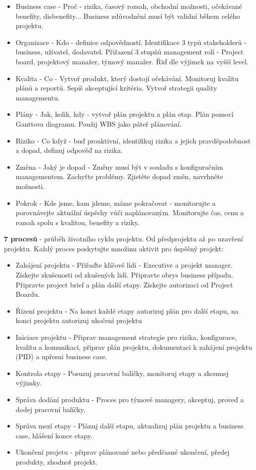\documentclass[11pt,a4paper]{article}
\begin{document}
        \begin{itemize}
            \item Business case - Proč - rizika, časový rozsah, obchodní možnosti, očekávané benefity, disbenefity... Business zdůvodnění musí být validní během celého projektu.
            \item Organizace - Kdo - definice odpovědností. Identifikace 3 typů stakeholderů - business, uživatel, dodavatel. Přiřazení 3 stupňů management rolí - Project board, projektový manažer, týmový manažer. Řiď dle výjimek na vyšší level.
            \item Kvalita - Co - Vytvoř produkt, který dostojí očekávání. Monitoruj kvalitu plánů a reportů. Sepiš akceptující kritéria. Vytvoř strategii quality managementu.
            \item Plány - Jak, kolik, kdy - vytvoř plán projektu a plán etap. Plán pomocí Ganttova diagramu. Použij WBS jako páteř plánování.
            \item Riziko - Co když - buď proaktivní, identifikuj rizika a jejich pravděpodobnost a dopad, definuj odpověď na rizika.
            \item Změna - Jaký je dopad - Změny musí být v souladu s konfiguračním managementem. Zachyťte problémy. Zjistěte dopad změn, navrhněte možnosti.
            \item Pokrok - Kde jsme, kam jdeme, máme pokračovat - monitorujte a porovnávejte aktuální úspěchy vůči naplánovaným. Monitorujte čas, cenu a rozsah spolu s kvalitou, benefity a riziky.
        \end{itemize}
        \textbf{7 procesů} - průběh životního cyklu projektu. Od předprojektu až po uzavření projektu. Každý proces poskytujte množinu aktivit pro úspěšný projekt:
        \begin{itemize}
            \item Zahájení projektu - Přiřaďte klíčové lidi - Executive a projekt manager. Získejte zkušenosti od zkušených lidí. Připravte obrys business případu. Připravte project brief a plán další etapy. Získejte autorizaci od Project Boardu.
            \item Řízení projektu - Na konci každé etapy autorizuj plán pro další etapu, na konci projektu autorizuj ukočení projektu
            \item Iniciace projektu - Připrav management strategie pro rizika, konfigurace, kvalitu a komunikaci, připrav plán projektu, dokumentaci k zahájení projektu (PID) a upřesni business case.
            \item Kontrola etapy - Posuzuj pracovní balíčky, monitoruj etapy a zkoumej výjimky.
            \item Správa dodání produktu - Proces pro týmové managery, akceptuj, proveď a dodej pracovní balíčky.
            \item Správa mezí etapy - Plánuj další etapu, aktualizuj plán projektu a business case, hlášení konce etapy.
            \item Ukončení projetu - připrav plánované nebo předčasné ukončení, předej produkty, zhodnoť projekt.
        \end{itemize}
\end{document}
